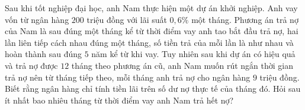 \begin{ex}%
	Sau khi tốt nghiệp đại học, anh Nam thực hiện một dự án khởi nghiệp. Anh vay vốn từ ngân hàng $200$ triệu đồng với lãi suất $0,6\%$ một tháng. Phương án trả nợ của Nam là sau đúng một tháng kể từ thời điểm vay anh tao bắt đầu trả nợ, hai lần liên tiếp cách nhau đúng một tháng, số tiền trả của mỗi lần là như nhau và hoàn thành sau đúng $5$ năm kể từ khi vay. Tuy nhiên sau khi dự án có hiệu quả và trả nợ được $12$ tháng theo phương án cũ, anh Nam muốn rút ngắn thời gian trả nợ nên từ tháng tiếp theo, mỗi tháng anh trả nợ cho ngân hàng $9$ triệu đồng. Biết rằng ngân hàng chỉ tính tiền lãi trên số dư  nợ thực tế của tháng đó. Hỏi sau ít nhất bao nhiêu tháng từ thời điểm vay anh Nam trả hết nợ?
\end{ex}


